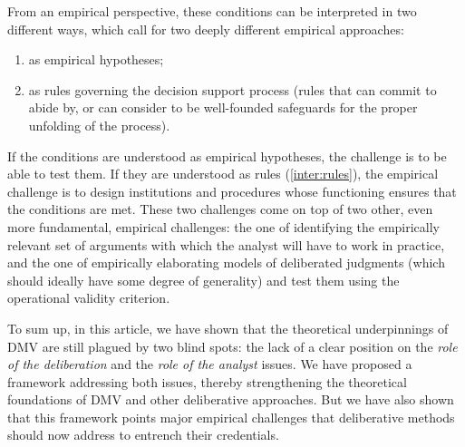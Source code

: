 \documentclass[a4paper, 11pt]{article}
\begin{document}

From an empirical perspective, these conditions can be interpreted in two different ways, which call for two deeply different empirical approaches:
\begin{enumerate}[label=\emph{\roman*}, ref=\emph{\roman*}]
		\item \label{inter:empir} as empirical hypotheses;
	\item \label{inter:rules} as rules governing the decision support process (rules that \thedm{} can commit to abide by, or can consider to be well-founded safeguards for the proper unfolding of the process).
\end{enumerate}

If the conditions are understood as empirical hypotheses, the challenge is to be able to test them. If they are understood as rules (\ref{inter:rules}), the empirical challenge is to design institutions and procedures whose functioning ensures that the conditions are met. These two challenges come on top of two other, even more fundamental, empirical challenges: the one of identifying the empirically relevant set of arguments with which the analyst will have to work in practice, and the one of empirically elaborating models of deliberated judgments (which should ideally have some degree of generality)  and test them using the operational validity criterion.

To sum up, in this article, we have shown that the theoretical underpinnings of \ac{DMV} are still plagued by two blind spots: the lack of a clear position on the \emph{role of the deliberation} and the \emph{role of the analyst} issues. We have proposed a framework addressing both issues, thereby strengthening the theoretical foundations of \ac{DMV} and other deliberative approaches.  But we have also shown that this framework points major empirical challenges that deliberative methods should now address to entrench their credentials.
 
\end{document}
